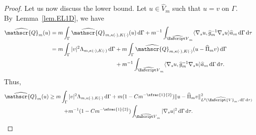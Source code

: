 \documentclass[JEP,XML,SOM,Unicode]{cedram}
\let\mathcal \EuScript
\newcommand{\scrQ}{\mathscr{Q}}
\newcommand{\cV}{\mathcal{V}}
\theoremstyle{plain}
\theoremstyle{definition}
\newcommand{\dx}{\mathrm{\,d}}
\begin{document}
\begin{proof}
Let us now discuss the lower bound. Let $u\in \widehat{V}_m$ such that $u = v$ on $\Gamma$.
By~Lem\-ma~\ref{lem.EL1D}, we have\
\[\begin{split}
\widehat{\scrQ}_m(u) &= m\int_\Gamma \widehat{\scrQ}_{m,\kappa(\cdot),K(\cdot)}(u)\dx \Gamma
+m^{-1}\int_{\widehat{\mathcal V}_{m}}\langle\nabla_{s} u,\widehat g^{-1}_m\nabla_{s} u\rangle\widehat a_m \dx \Gamma \dx\tau
\\
&
= m\int_\Gamma |v|^2\Lambda_{m,\kappa(\cdot),K(\cdot)}\dx \Gamma
+m\int_\Gamma \widehat{\scrQ}_{m,\kappa(\cdot),K(\cdot)}(u-\widehat{\Pi}_m v)\dx \Gamma
\\
&
\hspace*{4cm}+m^{-1}\int_{\widehat{\mathcal V}_{m}}\langle\nabla_{s} u,\widehat g^{-1}_m\nabla_{s} u\rangle\widehat a_m \dx \Gamma \dx\tau.
\end{split}\]
Thus,
\begin{multline}\label{eq:lemboundext8}
\widehat{\scrQ}_m(u)\geq m\int_\Gamma |v|^2\Lambda_{m,\kappa(\cdot),K(\cdot)}\dx \Gamma+m(1-Cm^{-\sfrac{1}{2}})\|u-\widehat{\Pi}_mv\|^2_{L^2(\widehat{\cV}_m, \dx\Gamma\dx\tau)} \\
+m^{-1}(1 - Cm^{-\sfrac{1}{2}})\int_{\widehat{\mathcal V}_{m}}|\nabla_s u|^2 \dx \Gamma \dx\tau.
\end{multline}


\end{proof}
\end{document}
